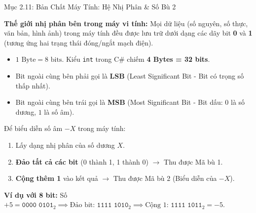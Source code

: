 \documentclass[aspectratio=169, 10pt]{beamer}
\begin{document}
\begin{frame}{Mục 2.11: Bản Chất Máy Tính: Hệ Nhị Phân \& Số Bù 2}
  \begin{block}{\textbf{Thế giới nhị phân bên trong máy vi tính:}}
    Mọi dữ liệu (số nguyên, số thực, văn bản, hình ảnh) trong máy tính đều được lưu trữ dưới dạng các dãy bit \textbf{0} và \textbf{1} (tương ứng hai trạng thái đóng/ngắt mạch điện).
    \begin{itemize}\small
      \item $1 \text{ Byte} = 8 \text{ bits}$. Kiểu \texttt{int} trong C\# chiếm \textbf{4 Bytes = 32 bits}.
      \item Bit ngoài cùng bên phải gọi là \textbf{LSB} (Least Significant Bit - Bit có trọng số thấp nhất).
      \item Bit ngoài cùng bên trái gọi là \textbf{MSB} (Most Significant Bit - Bit dấu: $0$ là số dương, $1$ là số âm).
    \end{itemize}
  \end{block}

  \begin{tcolorbox}[colback=UniLightBlue!30,colframe=UniBlue,title=\textbf{Biểu diễn số nguyên có dấu: Mã bù 2 (Two's Complement)},fonttitle=\small\bfseries]
    Để biểu diễn số âm $-X$ trong máy tính:
    \begin{enumerate}\small
      \item Lấy dạng nhị phân của số dương $X$.
      \item \textbf{Đảo tất cả các bit} (0 thành 1, 1 thành 0) $\to$ Thu được Mã bù 1.
      \item \textbf{Cộng thêm 1} vào kết quả $\to$ Thu được Mã bù 2 (Biểu diễn của $-X$).
    \end{enumerate}
    \textbf{Ví dụ với 8 bit:}
    Số $+5 = \texttt{0000 0101}_2 \implies \text{Đảo bit: } \texttt{1111 1010}_2 \implies \text{Cộng 1: } \texttt{1111 1011}_2 = -5$.
  \end{tcolorbox}
\end{frame}
\end{document}
